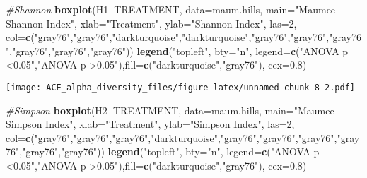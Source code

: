 \documentclass[]{article}
\newenvironment{Shaded}{\begin{snugshade}}{\end{snugshade}}
\newcommand{\KeywordTok}[1]{\textcolor[rgb]{0.13,0.29,0.53}{\textbf{#1}}}
\newcommand{\DataTypeTok}[1]{\textcolor[rgb]{0.13,0.29,0.53}{#1}}
\newcommand{\DecValTok}[1]{\textcolor[rgb]{0.00,0.00,0.81}{#1}}
\newcommand{\FloatTok}[1]{\textcolor[rgb]{0.00,0.00,0.81}{#1}}
\newcommand{\StringTok}[1]{\textcolor[rgb]{0.31,0.60,0.02}{#1}}
\newcommand{\CommentTok}[1]{\textcolor[rgb]{0.56,0.35,0.01}{\textit{#1}}}
\newcommand{\OperatorTok}[1]{\textcolor[rgb]{0.81,0.36,0.00}{\textbf{#1}}}
\newcommand{\NormalTok}[1]{#1}
\begin{document}
\begin{Shaded}
\begin{Highlighting}[]
\CommentTok{#Shannon}
\KeywordTok{boxplot}\NormalTok{(H1}\OperatorTok{~}\NormalTok{TREATMENT, }\DataTypeTok{data=}\NormalTok{maum.hills,}
        \DataTypeTok{main=}\StringTok{"Maumee Shannon Index"}\NormalTok{,}
        \DataTypeTok{xlab=}\StringTok{"Treatment"}\NormalTok{,}
        \DataTypeTok{ylab=}\StringTok{"Shannon Index"}\NormalTok{,}
        \DataTypeTok{las=}\DecValTok{2}\NormalTok{,}
        \DataTypeTok{col=}\KeywordTok{c}\NormalTok{(}\StringTok{"gray76"}\NormalTok{,}\StringTok{"gray76"}\NormalTok{,}\StringTok{"darkturquoise"}\NormalTok{,}\StringTok{"darkturquoise"}\NormalTok{,}\StringTok{"gray76"}\NormalTok{,}\StringTok{"gray76"}\NormalTok{,}\StringTok{"gray76"}\NormalTok{,}\StringTok{"gray76"}\NormalTok{,}\StringTok{"gray76"}\NormalTok{,}\StringTok{"gray76"}\NormalTok{))}
\KeywordTok{legend}\NormalTok{(}\StringTok{"topleft"}\NormalTok{, }\DataTypeTok{bty=}\StringTok{"n"}\NormalTok{, }\DataTypeTok{legend=}\KeywordTok{c}\NormalTok{(}\StringTok{"ANOVA p <0.05"}\NormalTok{,}\StringTok{"ANOVA p >0.05"}\NormalTok{),}\DataTypeTok{fill=}\KeywordTok{c}\NormalTok{(}\StringTok{"darkturquoise"}\NormalTok{,}\StringTok{"gray76"}\NormalTok{), }\DataTypeTok{cex=}\FloatTok{0.8}\NormalTok{)}
\end{Highlighting}
\end{Shaded}

\texttt{[image: ACE\_alpha\_diversity\_files/figure-latex/unnamed-chunk-8-2.pdf]}

\begin{Shaded}
\begin{Highlighting}[]
\CommentTok{#Simpson}
\KeywordTok{boxplot}\NormalTok{(H2}\OperatorTok{~}\NormalTok{TREATMENT, }\DataTypeTok{data=}\NormalTok{maum.hills,}
        \DataTypeTok{main=}\StringTok{"Maumee Simpson Index"}\NormalTok{,}
        \DataTypeTok{xlab=}\StringTok{"Treatment"}\NormalTok{,}
        \DataTypeTok{ylab=}\StringTok{"Simpson Index"}\NormalTok{,}
        \DataTypeTok{las=}\DecValTok{2}\NormalTok{,}
        \DataTypeTok{col=}\KeywordTok{c}\NormalTok{(}\StringTok{"gray76"}\NormalTok{,}\StringTok{"gray76"}\NormalTok{,}\StringTok{"gray76"}\NormalTok{,}\StringTok{"darkturquoise"}\NormalTok{,}\StringTok{"gray76"}\NormalTok{,}\StringTok{"gray76"}\NormalTok{,}\StringTok{"gray76"}\NormalTok{,}\StringTok{"gray76"}\NormalTok{,}\StringTok{"gray76"}\NormalTok{,}\StringTok{"gray76"}\NormalTok{))}
\KeywordTok{legend}\NormalTok{(}\StringTok{"topleft"}\NormalTok{, }\DataTypeTok{bty=}\StringTok{"n"}\NormalTok{, }\DataTypeTok{legend=}\KeywordTok{c}\NormalTok{(}\StringTok{"ANOVA p <0.05"}\NormalTok{,}\StringTok{"ANOVA p >0.05"}\NormalTok{),}\DataTypeTok{fill=}\KeywordTok{c}\NormalTok{(}\StringTok{"darkturquoise"}\NormalTok{,}\StringTok{"gray76"}\NormalTok{), }\DataTypeTok{cex=}\FloatTok{0.8}\NormalTok{)}
\end{Highlighting}
\end{Shaded}
\end{document}
